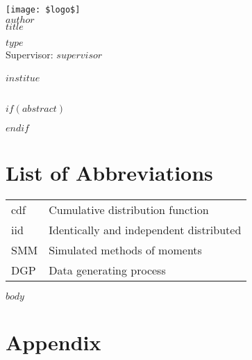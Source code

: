 \documentclass[a4paper, bibtotocnumbered,liststotoc,12pt]{scrartcl}
\theoremstyle{definition}
\theoremstyle{remark}
\numberwithin{figure}{section}
\numberwithin{table}{section}
\numberwithin{equation}{section}
\begin{document}
\setcounter{page}{0}
\begin{titlepage}
\begin{center}
\texttt{[image: \$logo\$]}\\
\vspace{\fill}
\large{$author$}\\
\Huge{$title$}
\end{center}
\vspace{\fill}
\large{$type$} \\
\large{Supervisor: $supervisor$}\\
\vspace{\fill}\\ 
$institue$\\
\\

\end{titlepage}

$if(abstract)$
  \begin{abstract}
  $abstract$
  \end{abstract}
$endif$




\newpage %
\tableofcontents %
\newpage
\thispagestyle{plain}
\listoffigures %
\listoftables %

\section*{List of Abbreviations}
\begin{tabular}{ll}
	cdf & Cumulative distribution function\\
	iid & Identically and independent distributed\\
	SMM & Simulated methods of moments\\
	DGP & Data generating process
\end{tabular}
\newpage



$body$

\newpage
\appendix
\section{Appendix}
\label{s:appendix}
\newpage
\printbibliography
\end{document}
